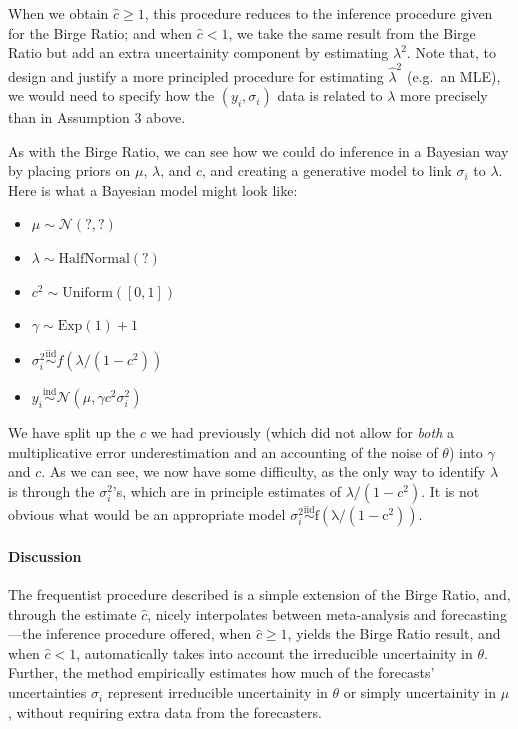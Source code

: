 \documentclass[12pt]{article}
\begin{document}
When we obtain $\hat c\geq 1$, this procedure reduces to the inference procedure given for the Birge Ratio; and when $\hat c<1$, we take the same result from the Birge Ratio but add an extra uncertainity component by estimating $\lambda^2$. Note that, to design and justify a more principled procedure for estimating $\hat \lambda^2$ (e.g.~an MLE), we would need to specify how the $(y_i,\sigma_i)$ data is related to $\lambda$ more precisely than in Assumption 3 above.

As with the Birge Ratio, we can see how we could do inference in a Bayesian way by placing priors on $\mu$, $\lambda$, and $c$, and creating a generative model to link $\sigma_i$ to $\lambda$. Here is what a Bayesian model might look like:

\begin{itemize}

\item
  $\mu \sim \mathcal{N}(?,?)$
\item
  $\lambda\sim \mathrm{HalfNormal}(?)$
\item
  $c^2\sim\mathrm{Uniform}([0,1])$
\item
  $\gamma\sim\mathrm{Exp}(1)+1$
\item
  $\sigma_i^2\overset{\mathrm{iid}}{\sim}f(\lambda/(1-c^2))$
\item
  $y_i\overset{\mathrm{ind}}{\sim}\mathcal{N}(\mu,\gamma c^2\sigma_i^2)$
\end{itemize}

We have split up the $c$ we had previously (which did not allow for \emph{both} a multiplicative error underestimation and an accounting of the noise of $\theta$) into $\gamma$ and $c$. As we can see, we now have some difficulty, as the only way to identify $\lambda$ is through the $\sigma_i^2$'s, which are in principle estimates of $\lambda/(1-c^2)$. It is not obvious what would be an appropriate model $\sigma_i^2\overset{\mathrm{iid}}{\sim}\mathrm{f(\lambda/(1-c^2))}$.

\paragraph{Discussion}\label{discussion-1}

The frequentist procedure described is a simple extension of the Birge Ratio, and, through the estimate $\hat c$, nicely interpolates between meta-analysis and forecasting---the inference procedure offered, when $\hat c\geq1$, yields the Birge Ratio result, and when $\hat c<1$, automatically takes into account the irreducible uncertainity in $\theta$. Further, the method empirically estimates how much of the forecasts' uncertainties $\sigma_i$ represent irreducible uncertainity in $\theta$ or simply uncertainity in $\mu$, without requiring extra data from the forecasters.
\end{document}
